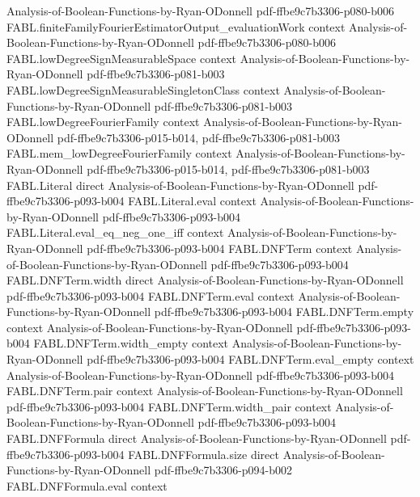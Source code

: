 \begin{theorem}
  {Analysis-of-Boolean-Functions-by-Ryan-ODonnell}
  {pdf-ffbe9c7b3306-p080-b006}
\proofstep
  {FABL.finiteFamilyFourierEstimatorOutput_evaluationWork}
  {context}
  {Analysis-of-Boolean-Functions-by-Ryan-ODonnell}
  {pdf-ffbe9c7b3306-p080-b006}
\proofstep
  {FABL.lowDegreeSignMeasurableSpace}
  {context}
  {Analysis-of-Boolean-Functions-by-Ryan-ODonnell}
  {pdf-ffbe9c7b3306-p081-b003}
\proofstep
  {FABL.lowDegreeSignMeasurableSingletonClass}
  {context}
  {Analysis-of-Boolean-Functions-by-Ryan-ODonnell}
  {pdf-ffbe9c7b3306-p081-b003}
\proofstep
  {FABL.lowDegreeFourierFamily}
  {context}
  {Analysis-of-Boolean-Functions-by-Ryan-ODonnell}
  {pdf-ffbe9c7b3306-p015-b014,
    pdf-ffbe9c7b3306-p081-b003}
\proofstep
  {FABL.mem_lowDegreeFourierFamily}
  {context}
  {Analysis-of-Boolean-Functions-by-Ryan-ODonnell}
  {pdf-ffbe9c7b3306-p015-b014,
    pdf-ffbe9c7b3306-p081-b003}
\proofstep
  {FABL.Literal}
  {direct}
  {Analysis-of-Boolean-Functions-by-Ryan-ODonnell}
  {pdf-ffbe9c7b3306-p093-b004}
\proofstep
  {FABL.Literal.eval}
  {context}
  {Analysis-of-Boolean-Functions-by-Ryan-ODonnell}
  {pdf-ffbe9c7b3306-p093-b004}
\proofstep
  {FABL.Literal.eval_eq_neg_one_iff}
  {context}
  {Analysis-of-Boolean-Functions-by-Ryan-ODonnell}
  {pdf-ffbe9c7b3306-p093-b004}
\proofstep
  {FABL.DNFTerm}
  {context}
  {Analysis-of-Boolean-Functions-by-Ryan-ODonnell}
  {pdf-ffbe9c7b3306-p093-b004}
\proofstep
  {FABL.DNFTerm.width}
  {direct}
  {Analysis-of-Boolean-Functions-by-Ryan-ODonnell}
  {pdf-ffbe9c7b3306-p093-b004}
\proofstep
  {FABL.DNFTerm.eval}
  {context}
  {Analysis-of-Boolean-Functions-by-Ryan-ODonnell}
  {pdf-ffbe9c7b3306-p093-b004}
\proofstep
  {FABL.DNFTerm.empty}
  {context}
  {Analysis-of-Boolean-Functions-by-Ryan-ODonnell}
  {pdf-ffbe9c7b3306-p093-b004}
\proofstep
  {FABL.DNFTerm.width_empty}
  {context}
  {Analysis-of-Boolean-Functions-by-Ryan-ODonnell}
  {pdf-ffbe9c7b3306-p093-b004}
\proofstep
  {FABL.DNFTerm.eval_empty}
  {context}
  {Analysis-of-Boolean-Functions-by-Ryan-ODonnell}
  {pdf-ffbe9c7b3306-p093-b004}
\proofstep
  {FABL.DNFTerm.pair}
  {context}
  {Analysis-of-Boolean-Functions-by-Ryan-ODonnell}
  {pdf-ffbe9c7b3306-p093-b004}
\proofstep
  {FABL.DNFTerm.width_pair}
  {context}
  {Analysis-of-Boolean-Functions-by-Ryan-ODonnell}
  {pdf-ffbe9c7b3306-p093-b004}
\proofstep
  {FABL.DNFFormula}
  {direct}
  {Analysis-of-Boolean-Functions-by-Ryan-ODonnell}
  {pdf-ffbe9c7b3306-p093-b004}
\proofstep
  {FABL.DNFFormula.size}
  {direct}
  {Analysis-of-Boolean-Functions-by-Ryan-ODonnell}
  {pdf-ffbe9c7b3306-p094-b002}
\proofstep
  {FABL.DNFFormula.eval}
  {context}

\end{theorem}

